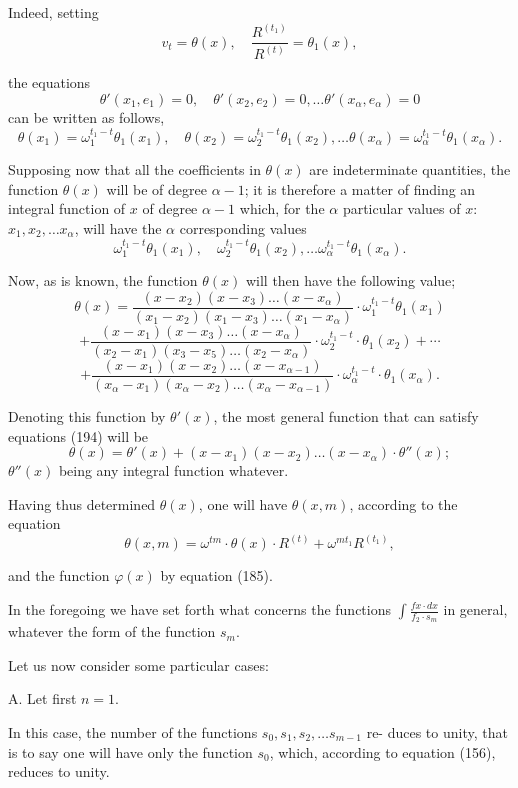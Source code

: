 \documentclass{article}
\begin{document}
Indeed, setting
\[ v_t = \theta(x), \quad \frac{R^{(t_1)}}{R^{(t)}} = \theta_1(x), \tag{193} \]

the equations
\[ \theta'(x_1,e_1) = 0, \quad \theta'(x_2,e_2) = 0, \ldots \theta'(x_\alpha,e_\alpha) = 0 \]
can be written as follows,
\[ \theta(x_1) = \omega_1^{t_1-t}\theta_1(x_1), \quad \theta(x_2) = \omega_2^{t_1-t}\theta_1(x_2), \ldots \theta(x_\alpha) = \omega_\alpha^{t_1-t}\theta_1(x_\alpha). \tag{194} \]

Supposing now that all the coefficients in $\theta(x)$ are indeterminate quantities, the function $\theta(x)$ will be of degree
$\alpha-1$; it is therefore a matter of finding an integral function of $x$ of degree $\alpha-1$ which, for the $\alpha$ particular values of $x$: $x_1, x_2, \ldots x_\alpha$, will have the $\alpha$ corresponding values
\[ \omega_1^{t_1-t}\theta_1(x_1), \quad \omega_2^{t_1-t}\theta_1(x_2), \ldots \omega_\alpha^{t_1-t}\theta_1(x_\alpha). \]

Now, as is known, the function $\theta(x)$ will then have the following value;
\[ \theta(x) = \frac{(x-x_2)(x-x_3)\ldots(x-x_\alpha)}{(x_1-x_2)(x_1-x_3)\ldots(x_1-x_\alpha)} \cdot \omega_1^{t_1-t}\theta_1(x_1) \]
\[ + \frac{(x-x_1)(x-x_3)\ldots(x-x_\alpha)}{(x_2-x_1)(x_3-x_5)\ldots(x_2-x_\alpha)} \cdot \omega_2^{t_1-t} \cdot \theta_1(x_2) + \cdots \tag{195} \]
\[ + \frac{(x-x_1)(x-x_2)\ldots(x-x_{\alpha-1})}{(x_\alpha-x_1)(x_\alpha-x_2)\ldots(x_\alpha-x_{\alpha-1})} \cdot \omega_\alpha^{t_1-t} \cdot \theta_1(x_\alpha). \]

Denoting this function by $\theta'(x)$, the most general function that can satisfy equations (194) will be
\[ \theta(x) = \theta'(x)+(x-x_1)(x-x_2)\ldots(x-x_\alpha) \cdot \theta''(x); \tag{196} \]
$\theta''(x)$ being any integral function whatever.

Having thus determined $\theta(x)$, one will have $\theta(x,m)$, according to the equation
\[ \theta(x,m) = \omega^{tm} \cdot \theta(x) \cdot R^{(t)}+\omega^{mt_1}R^{(t_1)}, \tag{197} \]

and the function $\varphi(x)$ by equation (185).

In the foregoing we have set forth what concerns the functions $\displaystyle\int \frac{f x \cdot dx}{f_2 \cdot s_m}$ in general, whatever the form of the function $s_m$.

Let us now consider some particular cases:

A. Let first $n = 1$.

In this case, the number of the functions $s_0, s_1, s_2, \ldots s_{m-1}$ re-
duces to unity, that is to say one will have only the function $s_0$, which, according to equation (156), reduces to unity.
\end{document}
